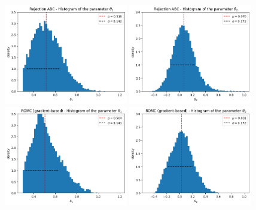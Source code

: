\begin{figure}[H]
    \begin{center}
      \includegraphics[width=0.48\textwidth]{./latex_files/images/chapter4/mae2_hist_t1_rejection.png}
      \includegraphics[width=0.48\textwidth]{./latex_files/images/chapter4/mae2_hist_t2_rejection.png}\\
      \includegraphics[width=0.48\textwidth]{./latex_files/images/chapter4/mae2_hist_t1_romc.png}
      \includegraphics[width=0.48\textwidth]{./latex_files/images/chapter4/mae2_hist_t2_romc.png}\\

\end{center}
\end{figure}
